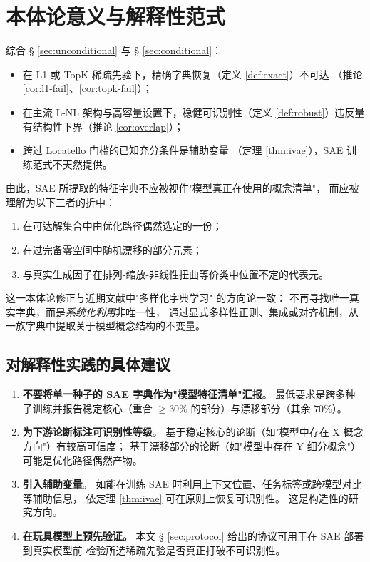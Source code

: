 \documentclass[11pt,a4paper]{article}
\theoremstyle{remark}
\begin{document}
\section{本体论意义与解释性范式}\label{sec:ontology}

综合 § \ref{sec:unconditional} 与 § \ref{sec:conditional}：

\begin{itemize}[leftmargin=*,itemsep=2pt]
\item 在 L1 或 TopK 稀疏先验下，精确字典恢复（定义 \ref{def:exact}）不可达
（推论 \ref{cor:l1-fail}、\ref{cor:topk-fail}）；
\item 在主流 L-NL 架构与高容量设置下，稳健可识别性（定义 \ref{def:robust}）违反量
有结构性下界（推论 \ref{cor:overlap}）；
\item 跨过 Locatello 门槛的已知充分条件是辅助变量
（定理 \ref{thm:ivae}），SAE 训练范式不天然提供。
\end{itemize}

由此，SAE 所提取的特征字典不应被视作"模型真正在使用的概念清单"，
而应被理解为以下三者的折中：
\begin{enumerate}[leftmargin=*,itemsep=2pt]
\item 在可达解集合中由优化路径偶然选定的一份；
\item 在过完备零空间中随机漂移的部分元素；
\item 与真实生成因子在排列-缩放-非线性扭曲等价类中位置不定的代表元。
\end{enumerate}

这一本体论修正与近期文献中"多样化字典学习" \cite{zheng2026} 的方向论一致：
不再寻找唯一真实字典，而是\emph{系统化利用}非唯一性，
通过显式多样性正则、集成或对齐机制，从一族字典中提取关于模型概念结构的不变量。

\subsection{对解释性实践的具体建议}

\begin{enumerate}[leftmargin=*,itemsep=2pt]
\item \textbf{不要将单一种子的 SAE 字典作为"模型特征清单"汇报}。
最低要求是跨多种子训练并报告稳定核心（重合 $\geq 30\%$ 的部分）与漂移部分（其余 $70\%$）。

\item \textbf{为下游论断标注可识别性等级}。
基于稳定核心的论断（如"模型中存在 X 概念方向"）有较高可信度；
基于漂移部分的论断（如"模型中存在 Y 细分概念"）可能是优化路径偶然产物。

\item \textbf{引入辅助变量}。
如能在训练 SAE 时利用上下文位置、任务标签或跨模型对比等辅助信息，
依定理 \ref{thm:ivae} 可在原则上恢复可识别性。
这是构造性的研究方向。

\item \textbf{在玩具模型上预先验证。}
本文 § \ref{sec:protocol} 给出的协议可用于在 SAE 部署到真实模型前
检验所选稀疏先验是否真正打破不可识别性。
\end{enumerate}
\end{document}
